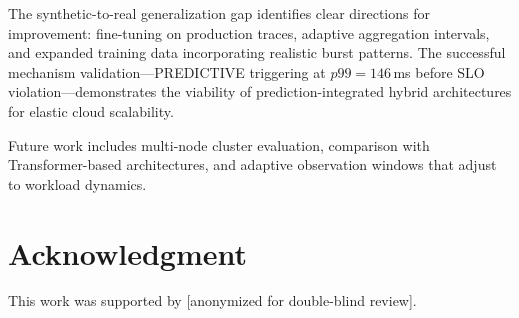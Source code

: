 \documentclass[conference,letterpaper]{IEEEtran}
\begin{document}
The synthetic-to-real generalization gap identifies clear directions for improvement: fine-tuning on production traces, adaptive aggregation intervals, and expanded training data incorporating realistic burst patterns. The successful mechanism validation---PREDICTIVE triggering at $p99 = 146$\,ms before SLO violation---demonstrates the viability of prediction-integrated hybrid architectures for elastic cloud scalability.

Future work includes multi-node cluster evaluation, comparison with Transformer-based architectures, and adaptive observation windows that adjust to workload dynamics.

\section*{Acknowledgment}

This work was supported by [anonymized for double-blind review].



\end{document}
